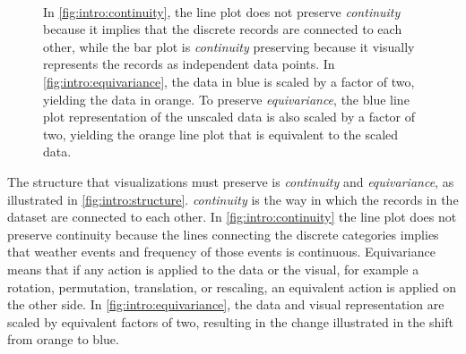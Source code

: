 \documentclass[journal]{vgtc}                %
\begin{document}
\begin{figure}[H]
  \centering 
  \\
\caption{In \autoref{fig:intro:continuity}, the line plot does not preserve \textit{continuity} because it implies that the discrete records are connected to each other, while the bar plot is \textit{continuity} preserving because it visually represents the records as independent data points. In \autoref{fig:intro:equivariance}, the data in blue is scaled by a factor of two, yielding the data in orange. To preserve \textit{equivariance}, the blue line plot representation of the unscaled data is also scaled by a factor of two, yielding the orange line plot that is equivalent to the scaled data.}
\label{fig:intro:structure}
\end{figure}
The structure that visualizations must preserve is \textit{continuity} and \textit{equivariance}, as illustrated in \autoref{fig:intro:structure}. \textit{continuity} is the way in which the records in the dataset are connected to each other. In \autoref{fig:intro:continuity} the line plot does not preserve continuity because the lines connecting the discrete categories implies that weather events and frequency of those events is continuous. Equivariance means that if any action is applied to the data or the visual, for example a rotation, permutation, translation, or rescaling, an equivalent action is applied on the other side. In \autoref{fig:intro:equivariance}, the data and visual representation are scaled by equivalent factors of two, resulting in the change illustrated in the shift from orange to blue.  
\end{document}
